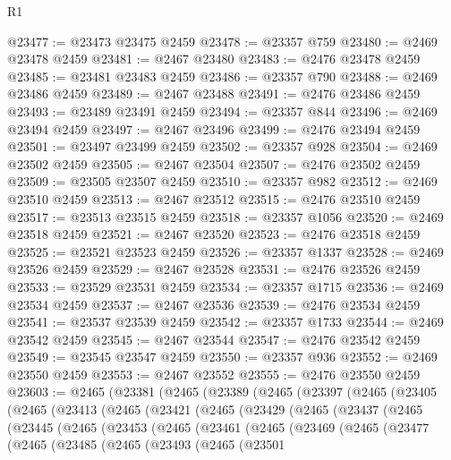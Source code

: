 \begin{lexlean}{R1}
\begin{coremodule}
@23477 := @23473 @23475 @2459
@23478 := @23357 @759
@23480 := @2469 @23478 @2459
@23481 := @2467 @23480
@23483 := @2476 @23478 @2459
@23485 := @23481 @23483 @2459
@23486 := @23357 @790
@23488 := @2469 @23486 @2459
@23489 := @2467 @23488
@23491 := @2476 @23486 @2459
@23493 := @23489 @23491 @2459
@23494 := @23357 @844
@23496 := @2469 @23494 @2459
@23497 := @2467 @23496
@23499 := @2476 @23494 @2459
@23501 := @23497 @23499 @2459
@23502 := @23357 @928
@23504 := @2469 @23502 @2459
@23505 := @2467 @23504
@23507 := @2476 @23502 @2459
@23509 := @23505 @23507 @2459
@23510 := @23357 @982
@23512 := @2469 @23510 @2459
@23513 := @2467 @23512
@23515 := @2476 @23510 @2459
@23517 := @23513 @23515 @2459
@23518 := @23357 @1056
@23520 := @2469 @23518 @2459
@23521 := @2467 @23520
@23523 := @2476 @23518 @2459
@23525 := @23521 @23523 @2459
@23526 := @23357 @1337
@23528 := @2469 @23526 @2459
@23529 := @2467 @23528
@23531 := @2476 @23526 @2459
@23533 := @23529 @23531 @2459
@23534 := @23357 @1715
@23536 := @2469 @23534 @2459
@23537 := @2467 @23536
@23539 := @2476 @23534 @2459
@23541 := @23537 @23539 @2459
@23542 := @23357 @1733
@23544 := @2469 @23542 @2459
@23545 := @2467 @23544
@23547 := @2476 @23542 @2459
@23549 := @23545 @23547 @2459
@23550 := @23357 @936
@23552 := @2469 @23550 @2459
@23553 := @2467 @23552
@23555 := @2476 @23550 @2459
@23603 := @2465
    (@23381
      (@2465
        (@23389
          (@2465
            (@23397
              (@2465
                (@23405
                  (@2465
                    (@23413
                      (@2465
                        (@23421
                          (@2465
                            (@23429
                              (@2465
                                (@23437
                                  (@2465
                                    (@23445
                                      (@2465
                                        (@23453
                                          (@2465
                                            (@23461
                                              (@2465
                                                (@23469
                                                  (@2465
                                                    (@23477
                                                      (@2465
                                                        (@23485
                                                          (@2465
                                                            (@23493
                                                              (@2465
                                                                (@23501

\end{coremodule}
\end{lexlean}
